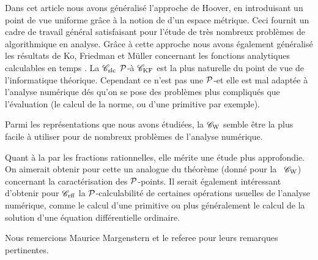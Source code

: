 Dans cet article nous avons généralisé l'approche de Hoover, en 
introduisant un point de vue uniforme grâce à la notion de \rp  d'un espace 
métrique.
Ceci fournit un cadre de travail général satisfaisant pour l'étude de 
très nombreux problèmes de \com algorithmique en analyse. Grâce à cette approche
nous avons également généralisé  les 
résultats de Ko, Friedman et Müller concernant les fonctions analytiques 
calculables en temps \poll.  
La \rp  ${{{\mathscr C}}_{\rm slc}}$ ${\cal P}$-\equiva à  ${{{\mathscr C}}_{\rm KF}}$ est la plus naturelle du point de vue de 
l'informatique théorique. Cependant ce n'est pas une ${\cal P}$-\pres et elle est 
mal adaptée à l'analyse numérique dés qu'on se pose des problèmes plus 
compliqués que l'évaluation (le calcul de la norme, ou d'une primitive par 
exemple).

Parmi les représentations que nous avons étudiées, la \pres  ${{{\mathscr C}}_{\rm W}}$  semble 
être la plus facile à utiliser pour de nombreux problèmes de l'analyse 
numérique. 

Quant à la \pres par les fractions rationnelles, elle mérite 
une étude plus approfondie. On aimerait obtenir pour cette \pres un analogue du théorème (donné pour la \pres~${{{\mathscr C}}_{\rm W}}$) concernant la caractérisation des ${\cal P}$-points. 
Il serait également intéressant d'obtenir pour ${{{\mathscr C}}_{\rm rff}}$ la 
${\cal P}$-calculabilité de certaines opérations usuelles de l'analyse numérique, 
comme le calcul d'une primitive ou plus généralement le calcul de la 
solution d'une équation différentielle ordinaire. 


Nous remercions Maurice Margenstern et le referee pour leurs remarques 
pertinentes.

